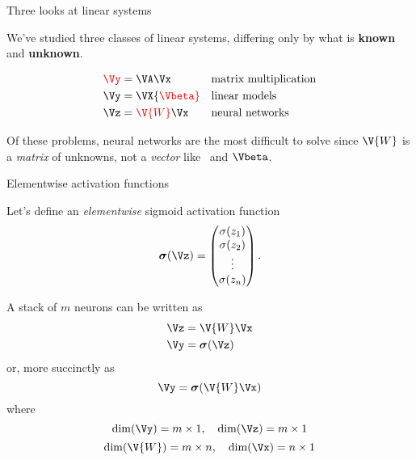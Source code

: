 \documentclass[9pt]{beamer}
\newcommand\bsigma{\boldsymbol{\sigma}}
\begin{document}
\begin{frame}{Three looks at linear systems}

We've studied three classes of linear systems, differing only by what is \textbf{known} and {\color{red}\textbf{unknown}}.

\bigskip
\large
\begin{align*}
	{\color{red}\Vy} &= \VA\Vx && \text{matrix multiplication} \\
	\Vy &= \VX{\color{red}\Vbeta} && \text{linear models} \\
	\Vz &= {\color{red}\V{W}}\Vx && \text{neural networks}
\end{align*}

\pause
\bigskip
\normalsize
Of these problems, neural networks are the most difficult to solve since $\V{W}$ is a \emph{matrix} of unknowns, not a \emph{vector} like \Vy\ and $\Vbeta$.
	
\end{frame}

\begin{frame}{Elementwise activation functions}

Let's define an \emph{elementwise} sigmoid activation function
\[ \bsigma(\Vz) = \begin{pmatrix} \sigma(z_1) \\ \sigma(z_2) \\ \vdots \\\sigma(z_n) \end{pmatrix}. \]
	
\pause
A stack of $m$ neurons can be written as
\begin{align*}
	\Vz &= \V{W}\Vx \\
	\Vy &= \bsigma(\Vz)	
\end{align*}
\pause
or, more succinctly as
\[ \Vy = \bsigma(\V{W}\Vx) \]
\pause
where
\[ \dim(\Vy)=m\times 1,\quad \dim(\Vz)=m\times 1 \]
\[ \dim(\V{W})=m\times n,\quad \dim(\Vx)=n\times 1 \]
\end{frame}
\end{document}
